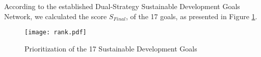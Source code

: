 \documentclass[12pt]{article}  %
\begin{document}
According to the established Dual-Strategy Sustainable Development Goals Network, we calculated the score $S_{Final}$, of the 17 goals, as presented in Figure \ref{fig:4.2}.


\begin{figure}[htbp]
\centering
\texttt{[image: rank.pdf]}
\caption{Prioritization of the 17 Sustainable Development Goals}\label{fig:4.2}
\end{figure}
\end{document}
